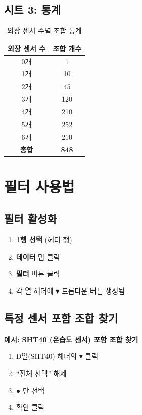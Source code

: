 \documentclass[11pt,a4paper]{article}
\begin{document}
\subsection{시트 3: 통계}

\begin{table}[H]
\centering
\begin{tabular}{|c|c|}
\hline
\rowcolor{tableheader}
\textbf{외장 센서 수} & \textbf{조합 개수} \\
\hline
0개 & 1 \\
\hline
1개 & 10 \\
\hline
2개 & 45 \\
\hline
3개 & 120 \\
\hline
4개 & 210 \\
\hline
5개 & 252 \\
\hline
6개 & 210 \\
\hline
\textbf{총합} & \textbf{848} \\
\hline
\end{tabular}
\caption{외장 센서 수별 조합 통계}
\end{table}

\section{필터 사용법}

\subsection{필터 활성화}

\begin{enumerate}
\item \textbf{1행 선택} (헤더 행)
\item \textbf{데이터} 탭 클릭
\item \textbf{필터} 버튼 클릭
\item 각 열 헤더에 $\blacktriangledown$ 드롭다운 버튼 생성됨
\end{enumerate}

\subsection{특정 센서 포함 조합 찾기}

\textbf{예시: SHT40 (온습도 센서) 포함 조합 찾기}

\begin{enumerate}
\item D열(SHT40) 헤더의 $\blacktriangledown$ 클릭
\item ``전체 선택'' 해제
\item \textbf{●} 만 선택
\item 확인 클릭
\end{enumerate}
\end{document}

